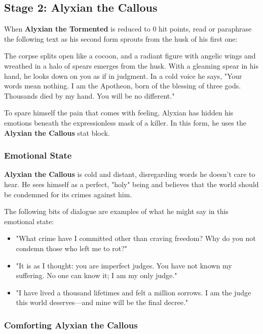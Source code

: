 \documentclass[a4paper, 11pt, bg=full, twocolumn, nooutline]{dndbook}
\begin{document}
\subsection{Stage 2: Alyxian the Callous}

When \textbf{Alyxian the Tormented} is reduced to 0 hit points, read or paraphrase the following text as his second form sprouts from the husk of his first one:

\begin{DndReadAloud}
The corpse splits open like a cocoon, and a radiant figure with angelic wings and wreathed in a halo of spears emerges from the husk. With a gleaming spear in his hand, he looks down on you as if in judgment. In a cold voice he says, "Your words mean nothing. I am the Apotheon, born of the blessing of three gods. Thousands died by my hand. You will be no different."
\end{DndReadAloud}

To spare himself the pain that comes with feeling, Alyxian has hidden his emotions beneath the expressionless mask of a killer. In this form, he uses the \textbf{Alyxian the Callous} stat block.


\subsubsection{Emotional State}

\textbf{Alyxian the Callous} is cold and distant, disregarding words he doesn't care to hear. He sees himself as a perfect, "holy" being and believes that the world should be condemned for its crimes against him.

The following bits of dialogue are examples of what he might say in this emotional state:

\begin{itemize}
\item "What crime have I committed other than craving freedom? Why do you not condemn those who left me to rot?"
\item "It is as I thought: you are imperfect judges. You have not known my suffering. No one can know it; I am my only judge."
\item "I have lived a thousand lifetimes and felt a million sorrows. I am the judge this world deserves---and mine will be the final decree."
\end{itemize}

\subsubsection{Comforting Alyxian the Callous}
\end{document}
